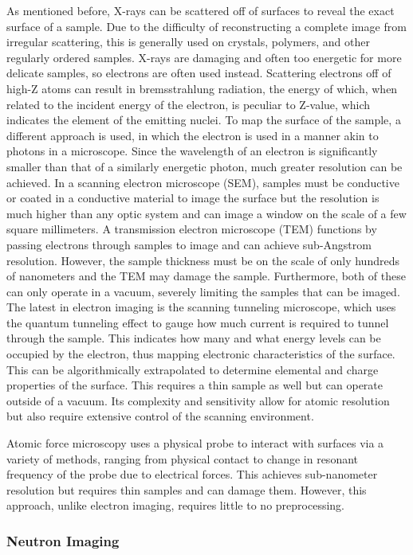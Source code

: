 As mentioned before, X-rays can be scattered off of surfaces to reveal the exact surface of a sample. Due to the difficulty of reconstructing a complete image from irregular scattering, this is generally used on crystals, polymers, and other regularly ordered samples. X-rays are damaging and often too energetic for more delicate samples, so electrons are often used instead. Scattering electrons off of high-Z atoms can result in bremsstrahlung radiation, the energy of which, when related to the incident energy of the electron, is peculiar to Z-value, which indicates the element of the emitting nuclei. To map the surface of the sample, a different approach is used, in which the electron is used in a manner akin to photons in a microscope. Since the wavelength of an electron is significantly smaller than that of a similarly energetic photon, much greater resolution can be achieved. In a scanning electron microscope (SEM), samples must be conductive or coated in a conductive material to image the surface but the resolution is much higher than any optic system and can image a window on the scale of a few square millimeters. A transmission electron microscope (TEM) functions by passing electrons through samples to image and can achieve sub-Angstrom resolution. However, the sample thickness must be on the scale of only hundreds of nanometers and the TEM may damage the sample. Furthermore, both of these can only operate in a vacuum, severely limiting the samples that can be imaged. The latest in electron imaging is the scanning tunneling microscope, which uses the quantum tunneling effect to gauge how much current is required to tunnel through the sample. This indicates how many and what energy levels can be occupied by the electron, thus mapping electronic characteristics of the surface. This can be algorithmically extrapolated to determine elemental and charge properties of the surface. This requires a thin sample as well but can operate outside of a vacuum. Its complexity and sensitivity allow for atomic resolution but also require extensive control of the scanning environment.

Atomic force microscopy uses a physical probe to interact with surfaces via a variety of methods, ranging from physical contact to change in resonant frequency of the probe due to electrical forces. This achieves sub-nanometer resolution but requires thin samples and can damage them. However, this approach, unlike electron imaging, requires little to no preprocessing.

\subsubsection{Neutron Imaging}


